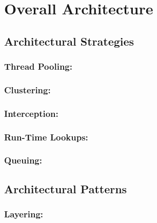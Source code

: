 \documentclass[12pt]{article}
\begin{document}
		\vspace{0.5cm}

\section{Overall Architecture}

	\subsection{Architectural Strategies}
	

	\subsubsection {Thread Pooling:} 
		

	\subsubsection {Clustering:} 


	\subsubsection{Interception:}
	

	\subsubsection {Run-Time Lookups:}


	\subsubsection {Queuing:}



	\subsection{Architectural Patterns}


	\subsubsection{Layering:} 
\end{document}
